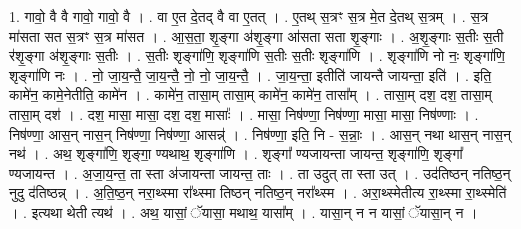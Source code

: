 \documentclass[17pt]{extarticle}
\begin{document}
1. गावो॒ वै वै गावो॒ गावो॒ वै । . वा ए॒त दे॒तद् वै वा ए॒तत् । . ए॒तथ् स॒त्रꣳ स॒त्र मे॒त दे॒तथ् स॒त्रम् । . स॒त्र मा॑सता सत स॒त्रꣳ स॒त्र मा॑सत । . आ॒स॒ता॒ शृ॒ङ्गा अ॑शृ॒ङ्गा आ॑सता सता शृ॒ङ्गाः । . अ॒शृ॒ङ्गाः स॒तीः स॒ती र॑शृ॒ङ्गा अ॑शृ॒ङ्गाः स॒तीः । . स॒तीः शृङ्गा॑णि॒ शृङ्गा॑णि स॒तीः स॒तीः शृङ्गा॑णि । . शृङ्गा॑णि नो नः॒ शृङ्गा॑णि॒ शृङ्गा॑णि नः । . नो॒ जा॒य॒न्तै॒ जा॒य॒न्तै॒ नो॒ नो॒ जा॒य॒न्तै॒ । . जा॒य॒न्ता॒ इतीति॑ जायन्तै जायन्ता॒ इति॑ । . इति॒ कामे॑न॒ कामे॒नेतीति॒ कामे॑न । . कामे॑न॒ तासा॒म् तासा॒म् कामे॑न॒ कामे॑न॒ तासा᳚म् । . तासा॒म् दश॒ दश॒ तासा॒म् तासा॒म् दश॑ । . दश॒ मासा॒ मासा॒ दश॒ दश॒ मासाः᳚ । . मासा॒ निष॑ण्णा॒ निष॑ण्णा॒ मासा॒ मासा॒ निष॑ण्णाः । . निष॑ण्णा॒ आस॒न् नास॒न् निष॑ण्णा॒ निष॑ण्णा॒ आसन्न्॑ । . निष॑ण्णा॒ इति॒ नि - स॒न्नाः॒ । . आस॒न् नथा थास॒न् नास॒न् नथ॑ । . अथ॒ शृङ्गा॑णि॒ शृङ्गा॒ ण्यथाथ॒ शृङ्गा॑णि । . शृङ्गा᳚ ण्यजायन्ता जायन्त॒ शृङ्गा॑णि॒ शृङ्गा᳚ ण्यजायन्त । . अ॒जा॒य॒न्त॒ ता स्ता अ॑जायन्ता जायन्त॒ ताः । . ता उदुत् ता स्ता उत् । . उद॑तिष्ठन् नतिष्ठ॒न् नुदु द॑तिष्ठन्न् । . अ॒ति॒ष्ठ॒न् नरा॒थ्स्मा रा᳚थ्स्मा तिष्ठन् नतिष्ठ॒न् नरा᳚थ्स्म । . अरा॒थ्स्मेतीत्य रा॒थ्स्मा रा॒थ्स्मेति॑ । . इत्यथा थेती त्यथ॑ । . अथ॒ यासां॒ ॅयासा॒ मथाथ॒ यासा᳚म् । . यासा॒न् न न यासां॒ ॅयासा॒न् न । \newline
\end{document}

